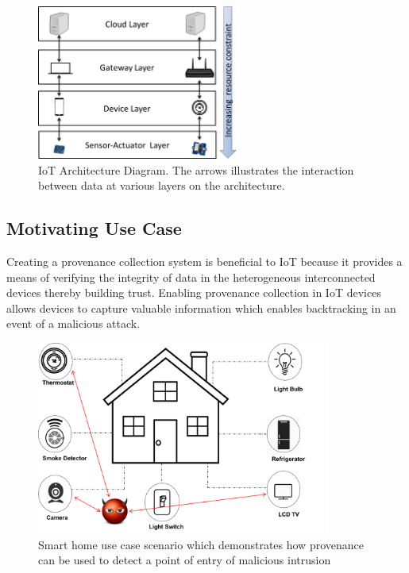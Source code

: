 \documentclass[conference]{IEEEtran}
\begin{document}
%
%
%


\begin{figure}[tb]
\begin{center}

\includegraphics[height=2.0in]{iot_architecture.png}
\end{center}
\caption{IoT Architecture Diagram. The arrows illustrates the interaction between data at various layers on the architecture.}
\label{iot_architecture}

\end{figure}

\subsection{Motivating Use Case}

Creating a provenance collection system is beneficial to IoT because it
provides a means of verifying the integrity of data in the heterogeneous interconnected devices thereby building trust. Enabling provenance collection in IoT devices allows devices to capture valuable information which enables backtracking in an event of a malicious attack. 


\begin{figure}[h!]
\begin{center}
\includegraphics[height=2.5in]{smart_home.png}
\end{center}
\caption{Smart home use case scenario which demonstrates how provenance can be used to detect a point of entry of malicious intrusion}
\label{smart_home}
\end{figure}
\end{document}
